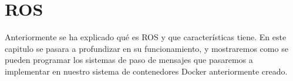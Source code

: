 \chapter{ROS}
Anteriormente se ha explicado qué es ROS y que características tiene. En este capitulo se pasara a profundizar en su funcionamiento, y mostraremos como se pueden programar los sistemas de paso de mensajes que pasaremos a implementar en nuestro sistema de contenedores Docker anteriormente creado.

